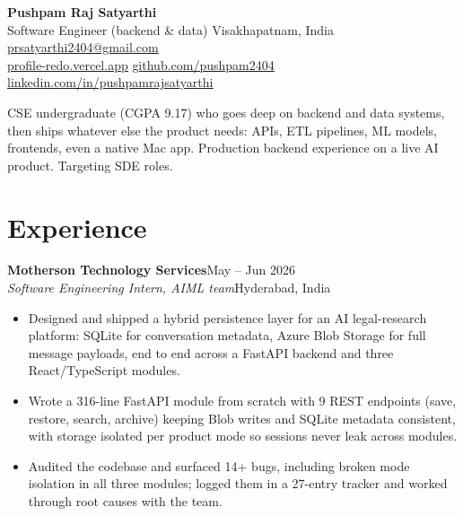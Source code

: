 \documentclass[10pt]{article}
\newcommand{\role}[4]{%
  \textbf{#1}\hfill{\color{mute}\small #2}\\[-1pt]
  {\small\itshape #3}\hfill{\color{mute}\small #4}\par\vspace{1pt}}
\newcommand{\lnk}[2]{\href{#1}{\color{ink}\underline{#2}}}
\begin{document}
{\fontsize{22}{24}\selectfont\bfseries Pushpam Raj Satyarthi}\\[3pt]
{\small\color{mute}
Software Engineer (backend \& data) \;\textperiodcentered\; Visakhapatnam, India \;\textperiodcentered\;
\ifdefined\phonenumber \phonenumber \;\textperiodcentered\; \fi
\lnk{mailto:prsatyarthi2404@gmail.com}{prsatyarthi2404@gmail.com}\\[1pt]
\lnk{https://profile-redo.vercel.app}{profile-redo.vercel.app} \;\textperiodcentered\;
\lnk{https://github.com/pushpam2404}{github.com/pushpam2404} \;\textperiodcentered\;
\lnk{https://www.linkedin.com/in/pushpamrajsatyarthi}{linkedin.com/in/pushpamrajsatyarthi}}

\vspace{6pt}
{\small CSE undergraduate (CGPA 9.17) who goes deep on backend and data systems, then ships whatever else the product needs:
APIs, ETL pipelines, ML models, frontends, even a native Mac app. Production backend experience on a live AI product. Targeting SDE roles.}

\section{Experience}
\role{Motherson Technology Services}{May -- Jun 2026}{Software Engineering Intern, AIML team}{Hyderabad, India}
\begin{itemize}
  \item Designed and shipped a hybrid persistence layer for an AI legal-research platform: SQLite for conversation metadata, Azure Blob Storage for full message payloads, end to end across a FastAPI backend and three React/TypeScript modules.
  \item Wrote a 316-line FastAPI module from scratch with 9 REST endpoints (save, restore, search, archive) keeping Blob writes and SQLite metadata consistent, with storage isolated per product mode so sessions never leak across modules.
  \item Audited the codebase and surfaced 14+ bugs, including broken mode isolation in all three modules; logged them in a 27-entry tracker and worked through root causes with the team.
\end{itemize}
\end{document}
